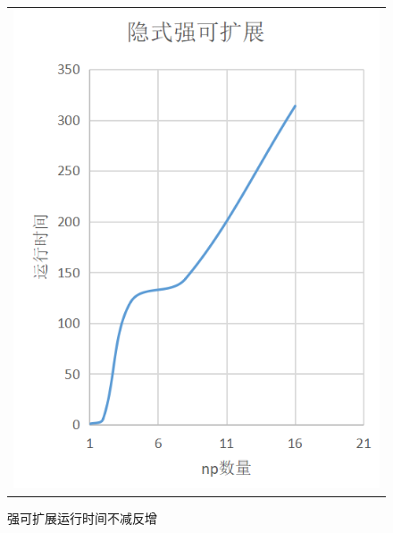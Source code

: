 \documentclass[3p]{elsarticle}
\numberwithin{equation}{section}
\begin{document}
\begin{figure}[h]
\begin{center}
\begin{tabular}{c}
				\includegraphics[angle=0, scale=0.25]{./figures/strong_im.png}
			\end{tabular}
		\end{center}
		\caption{强可扩展运行时间不减反增}
		\label{fig:illustration-strong}
	\end{figure}
\end{document}
